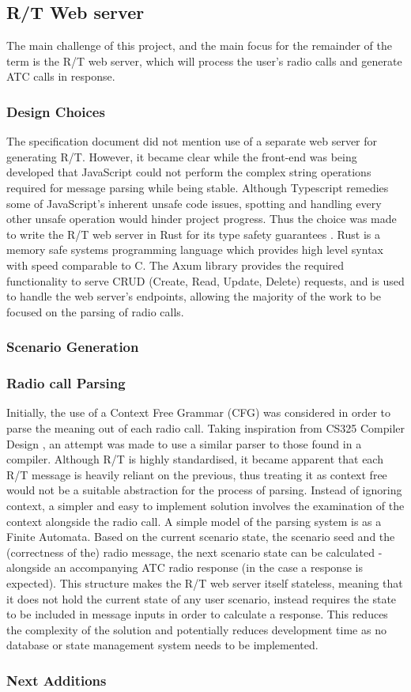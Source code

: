 \subsection{R/T Web server}
The main challenge of this project, and the main focus for the remainder of the term is the R/T web server, which will process the user's radio calls and generate ATC calls in response.

\subsubsection{Design Choices}
The specification document did not mention use of a separate web server for generating R/T. However, it became clear while the front-end was being developed that JavaScript could not perform the complex string operations required for message parsing while being stable. Although Typescript remedies some of JavaScript's inherent unsafe code issues, spotting and handling every other unsafe operation would hinder project progress. Thus the choice was made to write the R/T web server in Rust for its type safety guarantees \cite{Rust}. Rust is a memory safe systems programming language which provides high level syntax with speed comparable to C. The Axum library \cite{Axum} provides the required functionality to serve CRUD (Create, Read, Update, Delete) requests, and is used to handle the web server's endpoints, allowing the majority of the work to be focused on the parsing of radio calls.

\subsubsection{Scenario Generation}

\subsubsection{Radio call Parsing}
Initially, the use of a Context Free Grammar (CFG) was considered in order to parse the meaning out of each radio call. Taking inspiration from CS325 Compiler Design \cite{CS325}, an attempt was made to use a similar parser to those found in a compiler. Although R/T is highly standardised, it became apparent that each R/T message is heavily reliant on the previous, thus treating it as context free would not be a suitable abstraction for the process of parsing. Instead of ignoring context, a simpler and easy to implement solution involves the examination of the context alongside the radio call. A simple model of the parsing system is as a Finite Automata. Based on the current scenario state, the scenario seed and the (correctness of the) radio message, the next scenario state can be calculated - alongside an accompanying ATC radio response (in the case a response is expected). This structure makes the R/T web server itself stateless, meaning that it does not hold the current state of any user scenario, instead requires the state to be included in message inputs in order to calculate a response. This reduces the complexity of the solution and potentially reduces development time as no database or state management system needs to be implemented.

\subsubsection{Next Additions}
